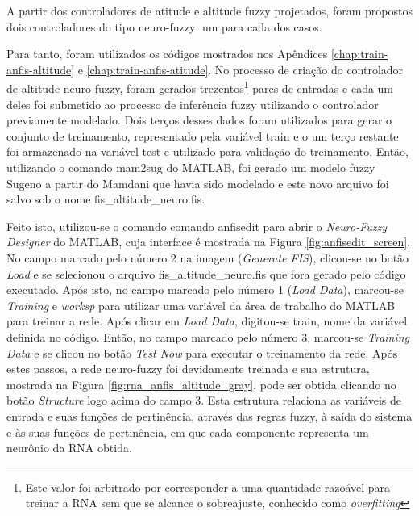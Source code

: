 A partir dos controladores de atitude e altitude fuzzy projetados, foram propostos dois controladores do tipo neuro-fuzzy: um para cada dos casos.

Para tanto, foram utilizados os códigos mostrados nos Apêndices \ref{chap:train-anfis-altitude} e \ref{chap:train-anfis-atitude}. No processo de criação do controlador de altitude neuro-fuzzy, foram gerados trezentos\footnote{Este valor foi arbitrado por corresponder a uma quantidade razoável para treinar a RNA sem que se alcance o sobreajuste, conhecido como \textit{overfitting}} pares de entradas e cada um deles foi submetido ao processo de inferência fuzzy utilizando o controlador previamente modelado. Dois terços desses dados foram utilizados para gerar o conjunto de treinamento, representado pela variável {\ttfamily train} e o um terço restante foi armazenado na variável {\ttfamily test} e utilizado para validação do treinamento. Então, utilizando o comando {\ttfamily mam2sug} do MATLAB, foi gerado um modelo fuzzy Sugeno a partir do Mamdani que havia sido modelado e este novo arquivo foi salvo sob o nome {\ttfamily fis\_altitude\_neuro.fis}.

Feito isto, utilizou-se o comando comando {\ttfamily anfisedit} para abrir o \textit{Neuro-Fuzzy Designer} do MATLAB, cuja interface é mostrada na Figura \ref{fig:anfisedit_screen}. No campo marcado pelo número 2 na imagem (\textit{Generate FIS}), clicou-se no botão \textit{Load} e se selecionou o arquivo {\ttfamily fis\_altitude\_neuro.fis} que fora gerado pelo código executado. Após isto, no campo marcado pelo número 1 (\textit{Load Data}), marcou-se \textit{Training} e \textit{worksp} para utilizar uma variável da área de trabalho do MATLAB para treinar a rede. Após clicar em \textit{Load Data}, digitou-se {\ttfamily train}, nome da variável definida no código. Então, no campo marcado pelo número 3, marcou-se \textit{Training Data} e se clicou no botão \textit{Test Now} para executar o treinamento da rede. Após estes passos, a rede neuro-fuzzy foi devidamente treinada e sua estrutura, mostrada na Figura \ref{fig:rna_anfis_altitude_gray}, pode ser obtida clicando no botão \textit{Structure} logo acima do campo 3. Esta estrutura relaciona as variáveis de entrada e suas funções de pertinência, através das regras fuzzy, à saída do sistema e às suas funções de pertinência, em que cada componente representa um neurônio da RNA obtida. 

